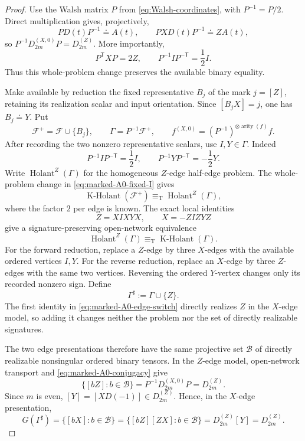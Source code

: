 \documentclass[11pt,letterpaper,onecolumn]{article}
\theoremstyle{plain}
\theoremstyle{definition}
\theoremstyle{remark}
\newcommand{\cF}{\mathcal F}
\newcommand{\Holant}{\operatorname{Holant}}
\newcommand{\KHolant}{\operatorname{K\text{-}Holant}}
\newcommand{\DihZ}[1]{{D_{#1}^{(Z)}}}
\newcommand{\DihXzero}[1]{{D_{#1}^{(X,0)}}}
\newcommand{\arity}{\operatorname{arity}}
\newcommand{\equivT}{\equiv_{\mathrm T}}
\begin{document}
\begin{proof}
Use the Walsh matrix \(P\) from \cref{eq:Walsh-coordinates}, with
\(P^{-1}=P/2\).
Direct multiplication gives, projectively,
\begin{equation}
 PD(t)P^{-1}\doteq A(t),
 \qquad
 PXD(t)P^{-1}\doteq ZA(t),
 \label{eq:marked-A0-conjugacy}
\end{equation}
so \(P^{-1}\DihXzero{2m}P=\DihZ{2m}\).  More importantly,
\begin{equation}
 P^{\mathsf T}XP=2Z,
 \qquad
 P^{-1}IP^{-\mathsf T}=\frac12I.
 \label{eq:marked-A0-fixed-I}
\end{equation}
Thus this whole-problem change preserves the available binary equality.

Make available by reduction the fixed representative \(B_j\) of the mark
\(j=[Z]\), retaining its realization scalar and input orientation.  Since
\([B_jX]=j\), one has \(B_j\doteq Y\).  Put
\[
 \cF^+=\cF\cup\{B_j\},
 \qquad
 \Gamma=P^{-1}\cF^+,
 \qquad
 f^{(X,0)}=(P^{-1})^{\otimes\arity(f)}f.
\]
After recording the two nonzero representative scalars, use \(I,Y\in\Gamma\). Indeed
\[
 P^{-1}IP^{-\mathsf T}=\frac12I,
 \qquad
 P^{-1}YP^{-\mathsf T}=-\frac12Y.
\]
Write \(\Holant^Z(\Gamma)\) for the homogeneous \(Z\)-edge half-edge
problem.  The whole-problem change in
\cref{eq:marked-A0-fixed-I} gives
\[
 \KHolant(\cF^+)\equivT\Holant^Z(\Gamma),
\]
where the factor \(2\) per edge is known.  The exact local identities
\begin{equation}
 Z=XIXYX,
 \qquad
 X=-ZIZYZ
 \label{eq:marked-A0-edge-switch}
\end{equation}
give a signature-preserving open-network equivalence
\begin{equation}
 \Holant^Z(\Gamma)\equivT\KHolant(\Gamma).
 \label{eq:marked-A0-open-equivalence}
\end{equation}
For the forward reduction, replace a \(Z\)-edge by three \(X\)-edges with the available ordered vertices \(I,Y\). For the reverse reduction, replace an \(X\)-edge by three \(Z\)-edges with the same two
vertices.  Reversing the ordered \(Y\)-vertex changes only its recorded
nonzero sign.  Define
\[
 \Gamma^\sharp:=\Gamma\cup\{Z\}.
\]
The first identity in \cref{eq:marked-A0-edge-switch} directly realizes
\(Z\) in the \(X\)-edge model, so adding it changes neither the
problem nor the set of directly realizable signatures.

The two edge presentations therefore have the same projective set
\(\mathscr B\) of directly realizable nonsingular ordered binary tensors.
In the \(Z\)-edge model, open-network transport and
\cref{eq:marked-A0-conjugacy} give
\[
 \{[bZ]:b\in\mathscr B\}
 =P^{-1}\DihXzero{2m}P
 =\DihZ{2m}.
\]
Since \(m\) is even,
\([Y]=[XD(-1)]\in\DihZ{2m}\).  Hence, in the \(X\)-edge
presentation,
\hypertarget{eq:marked-A0-complete-group}{}
\begin{equation*}
 G(\Gamma^\sharp)
 =\{[bX]:b\in\mathscr B\}
 =\{[bZ][ZX]:b\in\mathscr B\}
 =\DihZ{2m}[Y]
 =\DihZ{2m}.
\end{equation*}


\end{proof}
\end{document}

